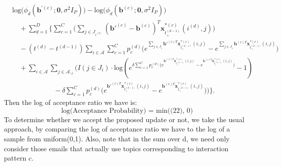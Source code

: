 \documentclass[a4paper]{article}
\begin{document}
  \begin{equation}
  \begin{aligned} 
  &\mbox{log}\Big(\phi_d(\boldsymbol{b}^{\prime(c)};\mathbf{0}, \sigma^2I_P)\Big)-\mbox{log}\Big(\phi_d(\boldsymbol{b}^{(c)};\mathbf{0}, \sigma^2I_P)\Big)\\&\quad+  \sum_{d=1}^D\Big\{\sum\limits_{c=1}^C\Big(\sum\limits_{j \in{J_{i^{(d)}}}}{(\boldsymbol{b}'^{(c)}-\boldsymbol{b}^{(c)})}^T\boldsymbol{x}^{*(c)}_{t^{(d-1)}_+}(i^{(d)}, j)\Big)\\&\quad-(t^{(d)}-t^{(d-1)})\sum\limits_{i \in \mathcal{A}}\sum\limits_{c=1}^Cp_c^{(d)}\Big(e^{\sum\limits_{j \in{J_i}} \boldsymbol{b}'^{(c)T}\boldsymbol{x}^{*(c)}_{t^{(d-1)}_+}(i, j)}-e^{\sum\limits_{j \in{J_i}} \boldsymbol{b}^{(c)T}\boldsymbol{x}^{*(c)}_{t^{(d-1)}_+}(i, j)}\Big)\\&\quad+\sum\limits_{i\in \mathcal{A}}\sum\limits_{j \in \mathcal{A}_{\backslash i }}\Big(I(j \in J_i)\cdot\mbox{log}(e^{\delta\sum\limits_{c=1}^Cp_c^{(d)}\Big( e^{\boldsymbol{b}'^{(c)T}\boldsymbol{x}^{*(c)}_{t^{(d-1)}_+}(i, j)}-e^{\boldsymbol{b}^{(c)T}\boldsymbol{x}^{*(c)}_{t^{(d-1)}_+}(i, j)}\Big)}-1)\\&\quad\quad\quad\quad\quad\quad-\delta\sum\limits_{c=1}^Cp_c^{(d)} \Big(e^{\boldsymbol{b}'^{(c)T}\boldsymbol{x}^{*(c)}_{t^{(d-1)}_+}(i, j)}-e^{\boldsymbol{b}^{(c)T}\boldsymbol{x}^{*(c)}_{t^{(d-1)}_+}(i, j)}\Big)\Big)\Big\}.
  \end{aligned}
  \end{equation}
 Then the log of acceptance ratio we have is:
 \begin{equation}
 \mbox{log(Acceptance Probability) = min((22), 0) }
 \end{equation}
 To determine whether we accept the proposed update or not, we take the usual approach, by comparing the log of acceptance ratio we have to the log of a sample from uniform(0,1). Also, note that in the sum over d, we need only consider those emails that actually use topics corresponding to interaction pattern $c$.  
\end{document}
